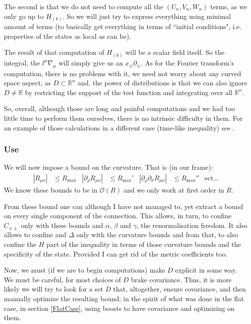 \documentclass[a4paper,11pt]{article}
\numberwithin{equation}{section}
\theoremstyle{definition}
\begin{document}
The second is that we do not need to compute all the $(U_n, V_n, W_n)$ terms, \color{red} as we only go up to $H_{(k)}$\color{black}. So we will just try to express everything using minimal amount of terms (to basically get everything in terms of ``initial conditions", i.e. properties of the states as local as can be).

The result of that computation of \color{red}$H_{(k)}$\color{black} will be a scalar field itself. So the integral, the $l^\mu \nabla_\mu$ will simply give us an $x_\pm \partial_\pm$.
As for the Fourier transform's computation, there is no problems with it, we need not worry about any curved space aspect, as $D\subset \mathbb{R}^n$ and, the power of distributions is that we can also ignore $D\ne \mathbb{R}$ by restricting the support of the test function and integrating over all $\mathbb{R}^n$.

So, overall, although those are long and painful computations and we had too little time to perform them ourselves, there is no intrinsic difficulty in them. For an example of those calculations in a different case (time-like inequality) see \cite{TimeLikeCompute}.
\subsubsection{Use}
We will now impose a bound on the curvature. That is (in our frame):
\begin{align}
    |R_{\mu\nu}| &\leq R_\mathrm{max}&
    |\partial_\rho R_{\mu\nu}| &\leq
    R_\mathrm{max}'&
    |\partial_\rho\partial_\sigma
    R_{\mu\nu}| & \leq R_\mathrm{max}''&
    \mathrm{ect}...
\end{align}
We know these bounds to be in $\mathcal{O}(R)$ and we only work at first order in $R$.

From these bound one can \color{red} although I have not managed to, yet \color{black} extract a bound on every single component of the connection. This allows, in turn, to confine $C_{\pm\pm}$ only with these bounds and $\alpha$, $\beta$ and $\gamma$, the renormalisation freedom. It also allows to confine and $\Delta$ only with the curvature bounds and from that, to also confine the $H$ part of the inequality in terms of those curvature bounds and the specificity of the state. \color{red} Provided I can get rid of the metric coefficients too. \color{black}

Now, we must (if we are to begin computations) make $D$ explicit in some way. We must be careful, for most choices of $D$ brake covariance. Thus, it is more likely we will try to look for a set $D$ that, altogether, ensure covariance, and then manually optimize the resulting bound; in the spirit of what was done in the flat case, in section \ref{FlatCase}, using boosts to have covariance and optimizing on them.
\end{document}
